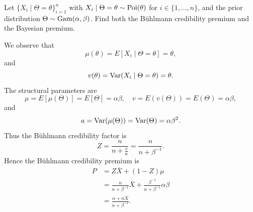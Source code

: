 \documentclass[notoc,notitlepage]{tufte-book}
\begin{document}
\begin{eg}\label{eg:a_poisson_gamma_example_for_buhlmann_credibility}
  Let $\{X_i \mid \Theta = \theta\}_{i=1}^{n}$ with $X_i \mid \Theta = \theta
  \sim \operatorname{Poi}(\theta)$ for $i \in \{ 1, \ldots, n \}$, and the prior distribution
  $\Theta \sim \operatorname{Gam}(\alpha, \beta)$. Find both the B\"{u}hlmann credibility
  premium and the Bayesian premium.
\end{eg}

\begin{solution}
   We observe that
  \begin{equation*}
    \mu(\theta) = E[X_i \mid \Theta = \theta] = \theta,
  \end{equation*}
  and
  \begin{equation*}
    v(\theta) = \operatorname{Var}(X_i \mid \Theta = \theta) = \theta.
  \end{equation*}
  The structural parameters are
  \begin{equation*}
    \mu = E[\mu(\Theta)] = E[\Theta] = \alpha\beta,\quad
    v = E(v(\Theta)) = E(\Theta) = \alpha\beta,
  \end{equation*}
  and
  \begin{equation*}
    a = \operatorname{Var}(\mu(\Theta)) = \operatorname{Var}(\Theta) = \alpha\beta^2.
  \end{equation*}
  Thus the B\"{u}hlmann credibility factor is
  \begin{equation*}
    Z = \frac{n}{n + \frac{v}{a}} = \frac{n}{n + \beta^{-1}}.
  \end{equation*}
  Hence the B\"{u}hlmann credibility premium is
  \begin{align*}
    P &= Z \overline{X} + (1 - Z) \mu \\
      &= \frac{n}{n + \beta^{-1}} \overline{X} + \frac{\beta^{-1}}{n +
        \beta^{-1}} \alpha\beta \\
      &= \frac{\alpha + n \overline{X}}{n + \beta^{-1}}.
  \end{align*}


\end{solution}
\end{document}
